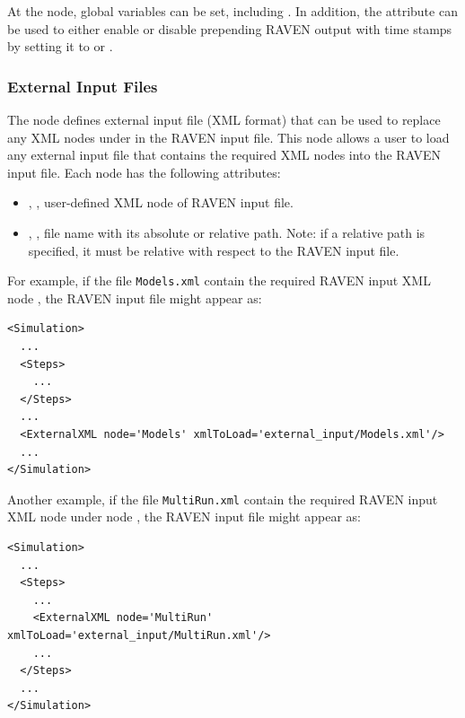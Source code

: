 At the  node, global variables can be set, including .  In addition, the
attribute  can be used to either enable or disable prepending RAVEN output with time stamps
by setting it to  or .


\subsubsection{External Input Files}
The  node defines external input file (XML format) that can be used to replace any XML nodes 
under  in the RAVEN input file. This node allows a user to load any external input file that contains 
the required XML nodes into the RAVEN input file. Each  node has the following attributes:
\begin{itemize}
\item {}, , user-defined XML node of RAVEN input file. 
\item {}, , file name with its absolute or relative path. Note: if a 
relative path is specified, it must be relative with respect to the RAVEN input file.
\end{itemize}
%
For example, if the file \texttt{Models.xml} contain the required RAVEN input XML node , 
the RAVEN input file might appear as: 
%
\begin{lstlisting}[style=XML,morekeywords={node,xmlToLoad}]  
<Simulation>
  ...
  <Steps>
    ...
  </Steps>
  ...
  <ExternalXML node='Models' xmlToLoad='external_input/Models.xml'/>
  ...
</Simulation>
\end{lstlisting}
%
Another example, if the file \texttt{MultiRun.xml} contain the required RAVEN input XML node  
under node , the RAVEN input file might appear as:
\begin{lstlisting}[style=XML,morekeywords={node,xmlToLoad}]  
<Simulation>
  ...
  <Steps>
    ...
    <ExternalXML node='MultiRun' xmlToLoad='external_input/MultiRun.xml'/>
    ...
  </Steps>
  ...
</Simulation>
\end{lstlisting}
